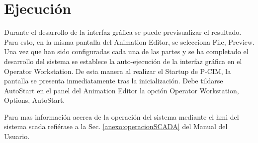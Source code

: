

\section{Ejecución}
\label{sec:Ejecucion}
Durante el desarrollo de la interfaz gráfica se puede previsualizar 
el resultado. Para esto, en la misma pantalla del Animation Editor,
se selecciona File, Preview. Una vez que han sido configuradas cada una de las 
partes y se ha completado el desarrollo del sistema se establece
la auto-ejecución de la interfaz gráfica en el Operator Workstation. De esta 
manera al realizar el Startup de P-CIM, la pantalla se presenta inmediatamente 
tras la inicialización. Debe tildarse AutoStart en el panel del Animation
Editor la opción Operator Workstation, Options, AutoStart.

Para mas información acerca de la operación del sistema mediante el \gls{hmi} 
del sistema \gls{scada} refiérase a la Sec. \ref{anexo:operacionSCADA} del
Manual del Usuario.
